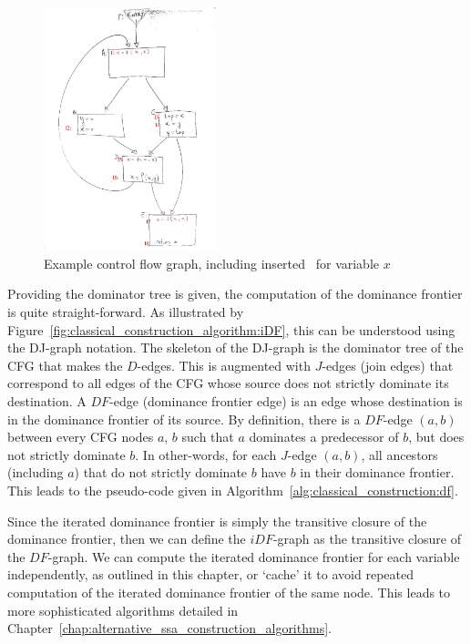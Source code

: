 \begin{figure}
\includegraphics[width=5cm]{ssa_variablex_label.pdf}
\caption{\label{fig:classical_construction_algorithm:examplecfg_varx}Example control flow graph, including
inserted \phifuns\ for variable $x$
}
\end{figure}

Providing the dominator tree is given, the computation of the dominance frontier is quite straight-forward. As illustrated by Figure~\ref{fig:classical_construction_algorithm:iDF}, this can be understood using the DJ-graph notation. The skeleton of the DJ-graph is the dominator tree of the CFG that makes the $D$-edges. This is augmented with $J$-edges (join edges) that correspond to all edges of the CFG whose source does not strictly dominate its destination. A $DF$-edge (dominance frontier edge) is an edge whose destination is in the dominance frontier of its source. By definition, there is a $DF$-edge $(a,b)$ between every CFG nodes $a$, $b$ such that $a$ dominates a predecessor of $b$, but does not strictly dominate $b$. 
In other-words, for each  $J$-edge $(a,b)$, all ancestors (including
$a$) that do not strictly dominate $b$ have $b$ in their dominance
frontier. This leads to the pseudo-code given in
Algorithm~\ref{alg:classical_construction:df}.

Since the iterated dominance frontier is simply the transitive closure
of the dominance frontier, then we can define the $iDF$-graph as the transitive closure of the $DF$-graph. 
We can compute the iterated dominance frontier for each variable independently, as outlined in this chapter, or `cache' it to avoid repeated computation of the iterated dominance frontier of the same node. This leads to more sophisticated algorithms detailed in Chapter~\ref{chap:alternative_ssa_construction_algorithms}.

